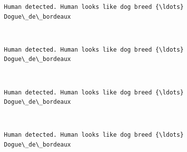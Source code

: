 \documentclass[11pt]{article}
\begin{document}
    \begin{Verbatim}[commandchars=\\\{\}]
Human detected. Human looks like dog breed {\ldots}
Dogue\_de\_bordeaux

    \end{Verbatim}

    \begin{center}
    \end{center}
    { \hspace*{\fill} \\}
    
    \begin{Verbatim}[commandchars=\\\{\}]
Human detected. Human looks like dog breed {\ldots}
Dogue\_de\_bordeaux

    \end{Verbatim}

    \begin{center}
    \end{center}
    { \hspace*{\fill} \\}
    
    \begin{Verbatim}[commandchars=\\\{\}]
Human detected. Human looks like dog breed {\ldots}
Dogue\_de\_bordeaux

    \end{Verbatim}

    \begin{center}
    \end{center}
    { \hspace*{\fill} \\}
    
    \begin{Verbatim}[commandchars=\\\{\}]
Human detected. Human looks like dog breed {\ldots}
Dogue\_de\_bordeaux

    \end{Verbatim}

    \begin{center}
    \end{center}
    { \hspace*{\fill} \\}
    
\end{document}
